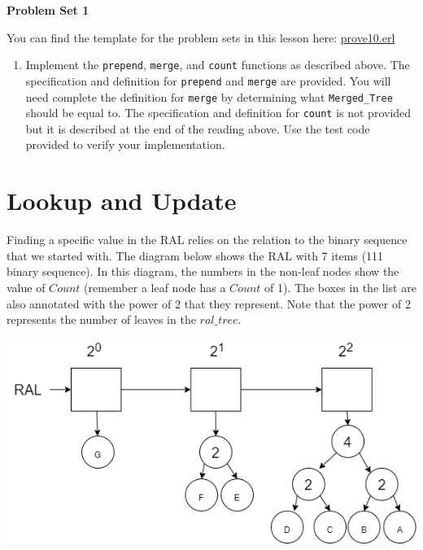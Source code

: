 \documentclass[
]{book}
\providecommand{\tightlist}{%
  \setlength{\itemsep}{0pt}\setlength{\parskip}{0pt}}
\begin{document}
\begin{problembox}

\textbf{Problem Set 1}

You can find the template for the problem sets in this lesson here: \href{proves/prove10.erl}{prove10.erl}

\begin{enumerate}
\def\labelenumi{\arabic{enumi}.}
\tightlist
\item
  Implement the \texttt{prepend}, \texttt{merge}, and \texttt{count} functions as described above. The specification and definition for \texttt{prepend} and \texttt{merge} are provided. You will need complete the definition for \texttt{merge} by determining what \texttt{Merged\_Tree} should be equal to. The specification and definition for \texttt{count} is not provided but it is described at the end of the reading above. Use the test code provided to verify your implementation.
\end{enumerate}

\end{problembox}

\hypertarget{lookup-and-update}{%
\section{Lookup and Update}\label{lookup-and-update}}

Finding a specific value in the RAL relies on the relation to the binary sequence that we started with. The diagram below shows the RAL with 7 items (111 binary sequence). In this diagram, the numbers in the non-leaf nodes show the value of \(Count\) (remember a leaf node has a \(Count\) of 1). The boxes in the list are also annotated with the power of 2 that they represent. Note that the power of 2 represents the number of leaves in the \(ral\_tree\).

\includegraphics{images/ral7_counting.drawio.png}
\end{document}
